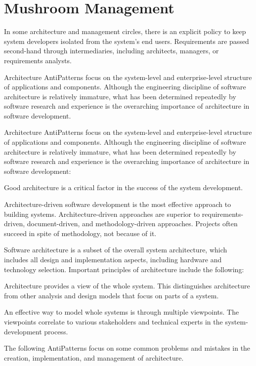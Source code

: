 \documentclass{book}
\newcounter{subpart}
\begin{document}
\chapter{Mushroom Management}
In some architecture and management circles, there is an explicit policy to keep system developers isolated from the system’s end users.
Requirements are passed second-hand through intermediaries, including architects, managers, or requirements analysts.

Architecture AntiPatterns focus on the system-level and enterprise-level structure of applications and components.
Although the engineering discipline of software architecture is relatively immature,
what has been determined repeatedly by software research and experience is the overarching importance of architecture in software development.

Architecture AntiPatterns focus on the system-level and enterprise-level structure of applications and components.
Although the engineering discipline of software architecture is relatively immature,
what has been determined repeatedly by software research and experience is the overarching importance of architecture in software development:

    Good architecture is a critical factor in the success of the system development.

    Architecture-driven software development is the most effective approach to building systems.
    Architecture-driven approaches are superior to requirements-driven, document-driven, and methodology-driven approaches. Projects often succeed in spite of methodology, not because of it.

Software architecture is a subset of the overall system architecture, which includes all design and implementation aspects, including hardware and technology selection.
Important principles of architecture include the following:

    Architecture provides a view of the whole system. This distinguishes architecture from other analysis and design models that focus on parts of a system.

    An effective way to model whole systems is through multiple viewpoints. The viewpoints correlate to various stakeholders and technical experts in the system-development process.


The following AntiPatterns focus on some common problems and mistakes in the creation, implementation, and management of architecture.
\end{document}
